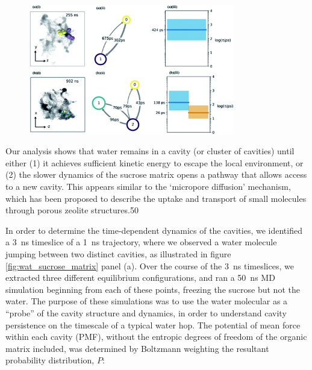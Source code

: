 \begin{figure}
    \centering
    \includegraphics[width=0.8\textwidth]{chapters/water_hopping/figures/f4.png}
    \label{fig:wat_hopping_mech}
\end{figure}

Our analysis shows that water remains in a cavity (or cluster of cavities) until either (1) it achieves sufficient kinetic energy to escape the local environment, or (2) the slower dynamics of the sucrose matrix opens a pathway that allows access to a new cavity. This appears similar to the `micropore diffusion’ mechanism, which has been proposed to describe the uptake and transport of small molecules through porous zeolite structures.50

In order to determine the time-dependent dynamics of the cavities, we identified a \SI{3}{\nano\second} timeslice of a \SI{1}{\nano\second} trajectory, where we observed a water molecule jumping between two distinct cavities, as illustrated in figure \ref{fig:wat_sucrose_matrix} panel (a). Over the course of the \SI{3}{\nano\second} timeslices, we extracted three different equilibrium configurations, and ran a \SI{50}{\nano\second} MD simulation beginning from each of these points, freezing the sucrose but not the water. The purpose of these simulations was to use the water molecular as a ``probe” of the cavity structure and dynamics, in order to understand cavity persistence on the timescale of a typical water hop. The potential of mean force within each cavity (PMF), without the entropic degrees of freedom of the organic matrix included, was determined by Boltzmann weighting the resultant probability distribution, $P$: 


